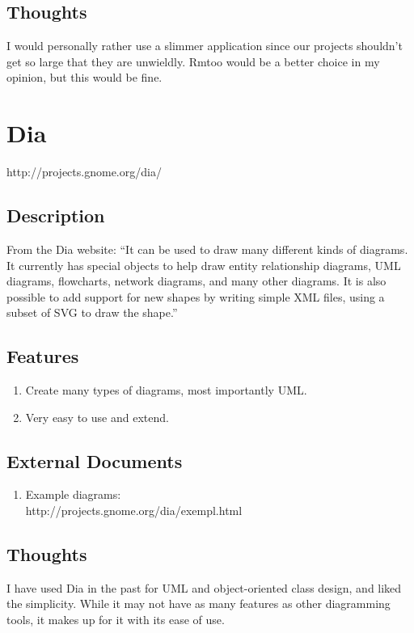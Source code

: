 \documentclass[12pt]{article}
\begin{document}
\subsection{Thoughts}
I would personally rather use a slimmer application since our projects
shouldn't get so large that they are unwieldly. Rmtoo would be a
better choice in my opinion, but this would be fine.

\newpage

\section{Dia}

http://projects.gnome.org/dia/

\subsection{Description}
From the Dia website: ``It can be used to draw many different kinds of
diagrams. It currently has special objects to help draw entity
relationship diagrams, UML diagrams, flowcharts, network diagrams, and
many other diagrams. It is also possible to add support for new shapes
by writing simple XML files, using a subset of SVG to draw the
shape.''

\subsection{Features}
\begin{enumerate}
\item Create many types of diagrams, most importantly UML.
\item Very easy to use and extend.
\end{enumerate}

\subsection{External Documents}
\begin{enumerate}
\item Example diagrams: \\
  http://projects.gnome.org/dia/exempl.html
\end{enumerate}

\subsection{Thoughts}
I have used Dia in the past for UML and object-oriented class design,
and liked the simplicity. While it may not have as many features as
other diagramming tools, it makes up for it with its ease of use.
\end{document}
